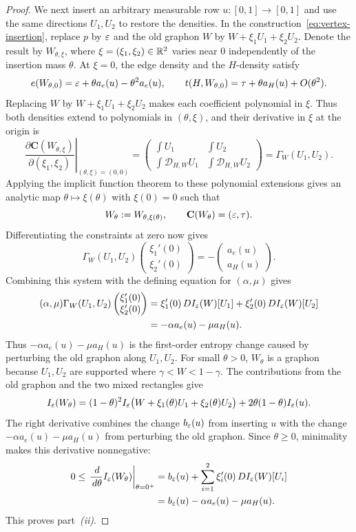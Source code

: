 \begin{proof}
We next insert an arbitrary measurable row $u:[0,1]\to[0,1]$ and use the
same directions $U_1,U_2$ to restore the densities.
In the construction~\eqref{eq:vertex-insertion}, replace $p$ by $\varepsilon$
and the old graphon $W$ by $W+\xi_1U_1+\xi_2U_2$.
Denote the result by $W_{\theta,\xi}$, where
$\xi=(\xi_1,\xi_2)\in\mathbb R^2$ varies near $0$ independently of the
insertion mass $\theta$.
At $\xi=0$, the edge density and the $H$-density satisfy
\[
  e(W_{\theta,0})=\varepsilon+\theta a_e(u) - \theta^2 a_e(u),\qquad
  t(H,W_{\theta,0})=\tau+\theta a_H(u)+O(\theta^2).
\]
Replacing $W$ by $W+\xi_1U_1+\xi_2U_2$ makes each coefficient polynomial
in $\xi$. Thus both densities extend to polynomials in $(\theta,\xi)$,
and their derivative in $\xi$ at the origin is
\[
  \left.\frac{\partial\mathbf C(W_{\theta,\xi})}{\partial(\xi_1,\xi_2)}
  \right|_{(\theta,\xi)=(0,0)}
  =
  \begin{pmatrix}
    \int U_1 & \int U_2\\
    \int\mathcal D_{H,W}U_1 & \int\mathcal D_{H,W}U_2
  \end{pmatrix}
  =\Gamma_W(U_1,U_2).
\]
Applying the implicit function theorem to these polynomial extensions
gives an analytic map $\theta\mapsto\xi(\theta)$ with
$\xi(0)=0$ such that
\[
  W_\theta:=W_{\theta,\xi(\theta)},\qquad
  \mathbf C(W_\theta)=(\varepsilon,\tau).
\]
Differentiating the constraints at zero now gives
\[
  \Gamma_W(U_1,U_2)
  \begin{pmatrix}\xi_1'(0)\\\xi_2'(0)\end{pmatrix}
  =-\begin{pmatrix}a_e(u)\\a_H(u)\end{pmatrix}.
\]
Combining this system with the defining equation for $(\alpha,\mu)$ gives
\begin{align*}
  (\alpha,\mu)\Gamma_W(U_1,U_2)
  \begin{pmatrix}\xi_1'(0)\\\xi_2'(0)\end{pmatrix}
  &=\xi_1'(0)\,DI_\varepsilon(W)[U_1]+\xi_2'(0)\,DI_\varepsilon(W)[U_2] \\
  &=-\alpha a_e(u)-\mu a_H(u).
\end{align*}
Thus $-\alpha a_e(u)-\mu a_H(u)$ is the first-order entropy change
caused by perturbing the old graphon along $U_1,U_2$.
For small $\theta>0$, $W_\theta$ is a graphon because $U_1,U_2$
are supported where $\gamma<W<1-\gamma$.
The contributions from the old graphon and the two mixed rectangles give
\[
  I_\varepsilon(W_\theta)
  =(1-\theta)^2I_\varepsilon\bigl(W+\xi_1(\theta)U_1+\xi_2(\theta)U_2\bigr)
  +2\theta(1-\theta)I_\varepsilon(u).
\]
The right derivative combines the change $b_\varepsilon(u)$ from inserting $u$
with the change $-\alpha a_e(u)-\mu a_H(u)$ from perturbing the old graphon.
Since $\theta\ge0$,
minimality makes this derivative nonnegative:
\begin{align*}
  0\le\left.\frac{\,d}{\,d\theta}I_\varepsilon(W_\theta)\right|_{\theta=0^+}
  &=b_\varepsilon(u)+\sum_{i=1}^2\xi_i'(0)\,DI_\varepsilon(W)[U_i]\\
  &=b_\varepsilon(u)-\alpha a_e(u)-\mu a_H(u).
\end{align*}
This proves part~\textit{(ii)}.


\end{proof}
